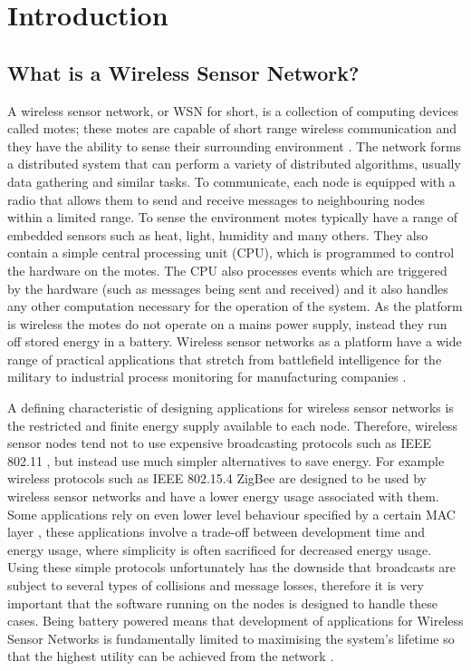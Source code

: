 \section{Introduction}

\subsection{What is a Wireless Sensor Network?}

A wireless sensor network, or WSN for short, is a collection of computing devices called motes; these motes are capable of short range wireless communication and they have the ability to sense their surrounding environment \cite{Mica2002}. The network forms a distributed system that can perform a variety of distributed algorithms, usually data gathering and similar tasks. To communicate, each node is equipped with a radio that allows them to send and receive messages to neighbouring nodes within a limited range. To sense the environment motes typically have a range of embedded sensors such as heat, light, humidity and many others. They also contain a simple central processing unit (CPU), which is programmed to control the hardware on the motes. The CPU also processes events which are triggered by the hardware (such as messages being sent and received) and it also handles any other computation necessary for the operation of the system. As the platform is wireless the motes do not operate on a mains power supply, instead they run off stored energy in a battery. Wireless sensor networks as a platform have a wide range of practical applications that stretch from battlefield intelligence for the military \cite{Akyildiz2002393,1368897,1457970} to industrial process monitoring for manufacturing companies \cite{1219475,4796311,4109116}.

A defining characteristic of designing applications for wireless sensor networks is the restricted and finite energy supply available to each node. Therefore, wireless sensor nodes tend not to use expensive broadcasting protocols such as IEEE 802.11 \cite{Mica2002}, but instead use much simpler alternatives to save energy. For example wireless protocols such as IEEE 802.15.4 ZigBee \cite{1253873, 4014617} are designed to be used by wireless sensor networks and have a lower energy usage associated with them. Some applications rely on even lower level behaviour specified by a certain MAC layer \cite{5751321,4469515,Polastre:2004:VLP:1031495.1031508,1019408,Buettner:2006:XSP:1182807.1182838}, these applications involve a trade-off between development time and energy usage, where simplicity is often sacrificed for decreased energy usage. Using these simple protocols unfortunately has the downside that broadcasts are subject to several types of collisions and message losses, therefore it is very important that the software running on the nodes is designed to handle these cases. Being battery powered means that development of applications for Wireless Sensor Networks is fundamentally limited to maximising the system's lifetime so that the highest utility can be achieved from the network \cite{4025017}.


